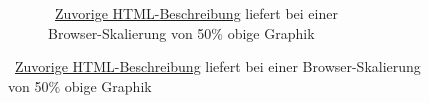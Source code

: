 \begin{figure}[h!t]
\begin{subfigure}[t]{.4\textwidth}
\begin{tikzpicture}
        \end{tikzpicture}
        \caption{~\hyperref[fig:anhang:webFontScaling]{Zuvorige HTML-Beschreibung} liefert bei einer Browser-Skalierung von 50$\%$ obige Graphik}\label{fig:anhang:webFontScaling:bild2}
    \end{subfigure}
\end{figure}